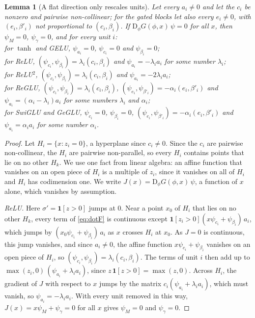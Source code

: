 \documentclass[10pt]{article}
\newtheorem{lemma}[theorem]{Lemma}
\theoremstyle{definition}
\theoremstyle{remark}
\newcommand{\Der}{\mathrm{D}}
\newenvironment{nested}{\par\nopagebreak\def\FrameCommand{\hspace{0.5em}{\color{black!30}\vrule width 0.6pt}\hspace{1em}}\MakeFramed{\advance\hsize-\width\FrameRestore}}{\endMakeFramed}
\begin{document}
\begin{nested}
\begin{lemma}[A flat direction only rescales units]\label{lem:unitid}
Let every $a_i \neq 0$ and let the $c_i$ be nonzero and pairwise non-collinear; for the gated blocks let also every $e_i \neq 0$, with $(e_i, \beta'_i)$ not proportional to $(c_i, \beta_i)$. If $\Der_\phi G(\phi, x)\,\psi = 0$ for all $x$, then $\psi_M = 0$, $\psi_\gamma = 0$, and for every unit $i$:\\
for $\tanh$ and GELU, $\psi_{a_i} = 0$, $\psi_{c_i} = 0$ and $\psi_{\beta_i} = 0$;\\
for ReLU, $(\psi_{c_i}, \psi_{\beta_i}) = \lambda_i(c_i, \beta_i)$ and $\psi_{a_i} = -\lambda_ia_i$ for some number $\lambda_i$;\\
for ReLU$^2$, $(\psi_{c_i}, \psi_{\beta_i}) = \lambda_i(c_i, \beta_i)$ and $\psi_{a_i} = -2\lambda_ia_i$;\\
for ReGLU, $(\psi_{c_i}, \psi_{\beta_i}) = \lambda_i(c_i, \beta_i)$, $(\psi_{e_i}, \psi_{\beta'_i}) = -\alpha_i(e_i, \beta'_i)$ and $\psi_{a_i} = (\alpha_i - \lambda_i)a_i$ for some numbers $\lambda_i$ and $\alpha_i$;\\
for SwiGLU and GeGLU, $\psi_{c_i} = 0$, $\psi_{\beta_i} = 0$, $(\psi_{e_i}, \psi_{\beta'_i}) = -\alpha_i(e_i, \beta'_i)$ and $\psi_{a_i} = \alpha_ia_i$ for some number $\alpha_i$.
\end{lemma}

\begin{proof}
Let $H_i = \{x : z_i = 0\}$, a hyperplane since $c_i \neq 0$. Since the $c_i$ are pairwise non-collinear, the $H_i$ are pairwise non-parallel, so every $H_i$ contains points that lie on no other $H_k$. We use one fact from linear algebra: an affine function that vanishes on an open piece of $H_i$ is a multiple of $z_i$, since it vanishes on all of $H_i$ and $H_i$ has codimension one. We write $J(x) = \Der_\phi G(\phi, x)\,\psi$, a function of $x$ alone, which vanishes by assumption.

\emph{ReLU.} Here $\sigma' = \mathbf 1[z > 0]$ jumps at $0$. Near a point $x_0$ of $H_i$ that lies on no other $H_k$, every term of \cref{eq:dotF} is continuous except $\mathbf 1[z_i > 0](x\psi_{c_i} + \psi_{\beta_i})\,a_i$, which jumps by $(x_0\psi_{c_i} + \psi_{\beta_i})\,a_i$ as $x$ crosses $H_i$ at $x_0$. As $J = 0$ is continuous, this jump vanishes, and since $a_i \neq 0$, the affine function $x\psi_{c_i} + \psi_{\beta_i}$ vanishes on an open piece of $H_i$, so $(\psi_{c_i}, \psi_{\beta_i}) = \lambda_i(c_i, \beta_i)$. The terms of unit $i$ then add up to $\max(z_i, 0)\,(\psi_{a_i} + \lambda_ia_i)$, since $z\,\mathbf 1[z > 0] = \max(z, 0)$. Across $H_i$, the gradient of $J$ with respect to $x$ jumps by the matrix $c_i(\psi_{a_i} + \lambda_ia_i)$, which must vanish, so $\psi_{a_i} = -\lambda_ia_i$. With every unit removed in this way, $J(x) = x\psi_M + \psi_\gamma = 0$ for all $x$ gives $\psi_M = 0$ and $\psi_\gamma = 0$.


\end{proof}
\end{nested}
\end{document}

